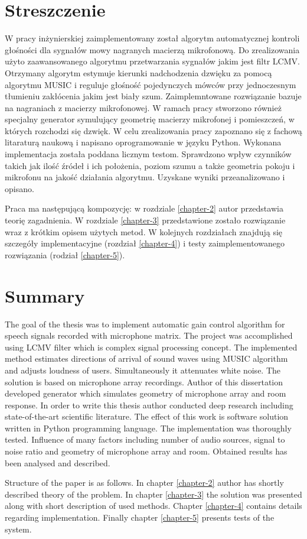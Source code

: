 \chapter*{Streszczenie}


W pracy inżynierskiej zaimplementowany został algorytm automatycznej kontroli głośności dla sygnałów mowy nagranych macierzą mikrofonową. Do zrealizowania użyto zaawansowanego algorytmu przetwarzania sygnałów jakim jest filtr LCMV. Otrzymany algorytm estymuje kierunki nadchodzenia dzwięku za pomocą algorytmu MUSIC i reguluje głośność pojedynczych mówców przy jednoczesnym tłumieniu zakłócenia jakim jest biały szum. Zaimplemntowane rozwiązanie bazuje na nagraniach z macierzy mikrofonowej. W ramach pracy stworzono również specjalny generator symulujący geometrię macierzy mikrofonej i pomieszczeń, w których rozchodzi się dzwięk. W celu zrealizowania pracy zapoznano się z fachową litaraturą naukową i napisano oprogramowanie w języku Python. Wykonana implementacja została poddana licznym testom. Sprawdzono wpływ czynników takich jak ilość źródeł i ich położenia, poziom szumu a także geometria pokoju i mikrofonu na jakość działania algorytmu. Uzyskane wyniki przeanalizowano i opisano. 

Praca ma następującą kompozycję: w rozdziale \ref{chapter-2} autor przedstawia teorię zagadnienia. W rozdziale \ref{chapter-3} przedstawione zostało rozwiązanie wraz z krótkim opisem użytych metod. W kolejnych rozdziałach znajdują się szczegóły implementacyjne (rozdział \ref{chapter-4}) i testy zaimplementowanego rozwiązania (rodział \ref{chapter-5}).

\newpage

\chapter*{Summary}

The goal of the thesis was to implement automatic gain control algorithm for speech signals recorded with microphone matrix. The project was accomplished using LCMV filter which is complex signal processing concept. The implemented method estimates directions of arrival of sound waves using MUSIC algorithm and adjusts loudness of users. Simultaneously it attenuates white noise. The solution is based on microphone array recordings. Author of this dissertation developed generator which simulates geometry of microphone array and room response. In order to write this thesis author conducted deep research including state-of-the-art scientific literature. The effect of this work is software solution written in Python programming language. The implementation was thoroughly tested. Influence of many factors including number of audio sources, signal to noise ratio and geometry of microphone array and room. Obtained results has been analysed and described. 

Structure of the paper is as follows. In chapter \ref{chapter-2} author has shortly described theory of the problem. In chapter \ref{chapter-3} the solution was presented along with short description of used methods. Chapter \ref{chapter-4} contains details regarding implementation. Finally chapter \ref{chapter-5} presents tests of the system.